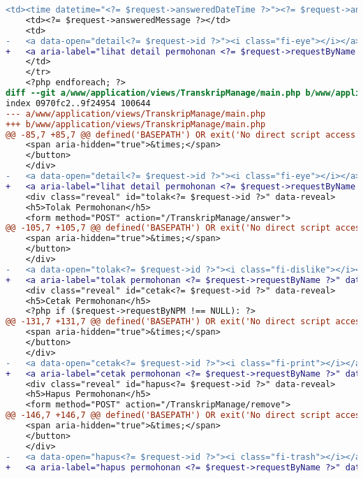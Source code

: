 \begin{lstlisting}[frame=single, label={lst:perbaikan_1.1.1_ikon_tanpa_nama}, language=diff, caption=Perbaikan Kriteria Sukses 1.1.1 - Ikon Tanpa Nama]
    <td><time datetime="<?= $request->answeredDateTime ?>"><?= $request->answeredDateString ?></time></td>
    <td><?= $request->answeredMessage ?></td>
    <td>
-   <a data-open="detail<?= $request->id ?>"><i class="fi-eye"></i></a>
+   <a aria-label="lihat detail permohonan <?= $request->requestByName ?>" data-open="detail<?= $request->id ?>"><i class="fi-eye"></i></a>
    </td>
    </tr>
    <?php endforeach; ?>
diff --git a/www/application/views/TranskripManage/main.php b/www/application/views/TranskripManage/main.php
index 0970fc2..9f24954 100644
--- a/www/application/views/TranskripManage/main.php
+++ b/www/application/views/TranskripManage/main.php
@@ -85,7 +85,7 @@ defined('BASEPATH') OR exit('No direct script access allowed');
    <span aria-hidden="true">&times;</span>
    </button>                                        
    </div>
-   <a data-open="detail<?= $request->id ?>"><i class="fi-eye"></i></a>
+   <a aria-label="lihat detail permohonan <?= $request->requestByName ?>" data-open="detail<?= $request->id ?>"><i class="fi-eye"></i></a>
    <div class="reveal" id="tolak<?= $request->id ?>" data-reveal>
    <h5>Tolak Permohonan</h5>
    <form method="POST" action="/TranskripManage/answer">
@@ -105,7 +105,7 @@ defined('BASEPATH') OR exit('No direct script access allowed');
    <span aria-hidden="true">&times;</span>
    </button>
    </div>
-   <a data-open="tolak<?= $request->id ?>"><i class="fi-dislike"></i></a>
+   <a aria-label="tolak permohonan <?= $request->requestByName ?>" data-open="tolak<?= $request->id ?>"><i class="fi-dislike"></i></a>
    <div class="reveal" id="cetak<?= $request->id ?>" data-reveal>
    <h5>Cetak Permohonan</h5>
    <?php if ($request->requestByNPM !== NULL): ?>
@@ -131,7 +131,7 @@ defined('BASEPATH') OR exit('No direct script access allowed');
    <span aria-hidden="true">&times;</span>
    </button>
    </div>
-   <a data-open="cetak<?= $request->id ?>"><i class="fi-print"></i></a>
+   <a aria-label="cetak permohonan <?= $request->requestByName ?>" data-open="cetak<?= $request->id ?>"><i class="fi-print"></i></a>
    <div class="reveal" id="hapus<?= $request->id ?>" data-reveal>
    <h5>Hapus Permohonan</h5>
    <form method="POST" action="/TranskripManage/remove">
@@ -146,7 +146,7 @@ defined('BASEPATH') OR exit('No direct script access allowed');
    <span aria-hidden="true">&times;</span>
    </button>
    </div>
-   <a data-open="hapus<?= $request->id ?>"><i class="fi-trash"></i></a>
+   <a aria-label="hapus permohonan <?= $request->requestByName ?>" data-open="hapus<?= $request->id ?>"><i class="fi-trash"></i></a>

\end{lstlisting}
